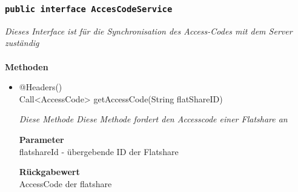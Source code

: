 	\subsubsection{\texttt{public interface AccesCodeService}}
\textit{Dieses Interface ist für die Synchronisation des Access-Codes mit dem Server zuständig }\\
\\
	\textbf{Methoden} \\
		\begin{itemize}
		\item{@Headers()\\ Call<AccessCode> getAccessCode(String flatShareID)}

		\textit{Diese Methode Diese Methode fordert den Accesscode einer Flatshare an}

		\textbf{Parameter} \\
	flatshareId - übergebende ID der Flatshare

		\textbf{Rückgabewert} \\
	AccessCode der flatshare


	 \end{itemize}

